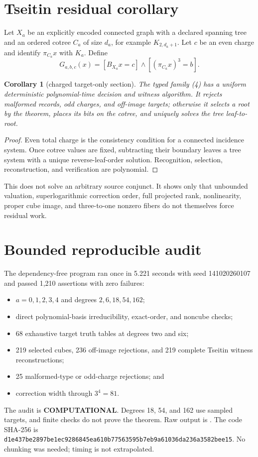 \documentclass[11pt]{article}
\newtheorem{corollary}[theorem]{Corollary}
\newcommand{\COMP}{\textbf{COMPUTATIONAL}}
\begin{document}
\section{Tseitin residual corollary}
Let $X_a$ be an explicitly encoded connected graph with a declared spanning
tree and an ordered cotree $C_a$ of size $d_a$, for example
$K_{2,d_a+1}$.  Let $c$ be an even charge and identify
$\pi_{C_a}x$ with $K_a$.  Define
\[
 G_{a,b,c}(x)=[B_{X_a}x=c]\land[(\pi_{C_a}x)^3=b]. \tag{4}
\]
\begin{corollary}[charged target-only section]
The typed family (4) has a uniform deterministic polynomial-time decision
and witness algorithm.  It rejects malformed records, odd charges, and
off-image targets; otherwise it selects a root by the theorem, places its
bits on the cotree, and uniquely solves the tree leaf-to-root.
\end{corollary}
\begin{proof}
Even total charge is the consistency condition for a connected incidence
system.  Once cotree values are fixed, subtracting their boundary leaves a
tree system with a unique reverse-leaf-order solution.  Recognition,
selection, reconstruction, and verification are polynomial.
\end{proof}

This does not solve an arbitrary source conjunct.  It shows only that
unbounded valuation, superlogarithmic correction order, full projected
rank, nonlinearity, proper cube image, and three-to-one nonzero fibers do
not themselves force residual work.

\section{Bounded reproducible audit}
The dependency-free program
 ran once in
5.221 seconds with seed 141020260107 and passed 1,210 assertions with zero
failures:
\begin{itemize}
\item $a=0,1,2,3,4$ and degrees $2,6,18,54,162$;
\item direct polynomial-basis irreducibility, exact-order, and noncube checks;
\item 68 exhaustive target truth tables at degrees two and six;
\item 219 selected cubes, 236 off-image rejections, and 219 complete
Tseitin witness reconstructions;
\item 25 malformed-type or odd-charge rejections; and
\item correction width through $3^4=81$.
\end{itemize}
The audit is \COMP{}.  Degrees 18, 54, and 162 use sampled targets, and
finite checks do not prove the theorem.  Raw output is
.
The code SHA-256 is
\texttt{d1e437be2897be1ec9286845ea610b77563595b7eb9a61036da236a3582bee15}.
No chunking was needed; timing is not extrapolated.
\end{document}
